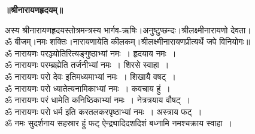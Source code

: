 \documentclass[twoside,top=1.7cm, bottom=1.7cm, outer=1cm,landscape, inner=1.5cm,a5paper,]{book}
\begin{document}
\newpage
\begin{center}{\bfseries\Huge ॥श्रीनारायणहृदयम्॥}\end{center}
अस्य श्रीनारायणहृदयस्तोत्रमन्त्रस्य भार्गव-ऋषिः।अनुष्टुप्छन्दः।श्रीलक्ष्मीनारायणो देवता।\\ॐ बीजम्।नमः शक्तिः।नारायणायेति कीलकम्।श्रीलक्ष्मीनारायणप्रीत्यर्थे जपे विनियोगः॥\\
ॐ नारायणः परञ्ज्योतिरित्यङ्गुष्ठाभ्यां नमः~। हृदयाय नमः~।\\
ॐ नारायणः परम्ब्रह्मेति 	तर्जनीभ्यां नमः~। शिरसे स्वाहा~।\\
ॐ नारायणः परो देवः इतिमध्यमाभ्यां नमः~। शिखायै वषट्~।\\
ॐ नारायणः परो ध्यातेत्यनामिकाभ्यां नमः~। कवचाय हुं~।\\
ॐ नारायणः परं धामेति कनिष्ठिकाभ्यां नमः~। नेत्रत्रयाय वौषट्~।\\
ॐ नारायणः परो धर्म इति करतलकरपृष्ठाभ्यां नमः~। अस्त्राय फट्~।\\
ॐ नमः सुदर्शनाय सहस्रार हुं फट् ऐन्द्र्यादिदशदिशं बध्नामि नमश्चक्राय स्वाहा~।
\end{document}
